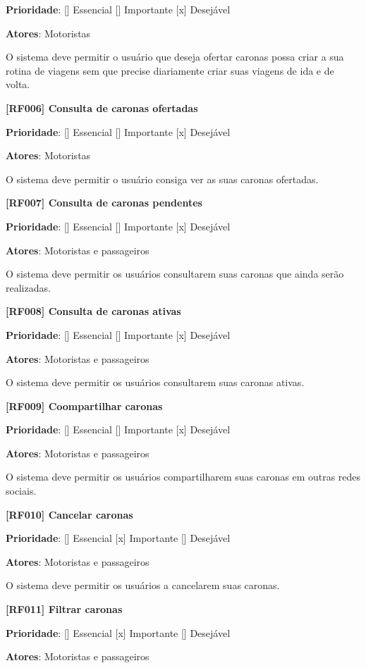 \textbf{Prioridade}:      [] Essencial        [] Importante     [x] Desejável 

\textbf{Atores}: Motoristas

O sistema deve permitir o usuário que deseja ofertar caronas possa criar a sua rotina de viagens sem que precise diariamente criar suas viagens de ida e de volta.


\textbf{[RF006] Consulta de caronas ofertadas}

\textbf{Prioridade}:      [] Essencial        [] Importante     [x] Desejável 

\textbf{Atores}: Motoristas

O sistema deve permitir o usuário consiga ver as suas caronas ofertadas.


\textbf{[RF007] Consulta de caronas pendentes}

\textbf{Prioridade}:      [] Essencial        [] Importante     [x] Desejável 

\textbf{Atores}: Motoristas e passageiros

O sistema deve permitir os usuários consultarem suas caronas que ainda serão realizadas.

\textbf{[RF008] Consulta de caronas ativas}

\textbf{Prioridade}:      [] Essencial        [] Importante     [x] Desejável 

\textbf{Atores}: Motoristas e passageiros

O sistema deve permitir os usuários consultarem suas caronas ativas.

\textbf{[RF009] Coompartilhar caronas}

\textbf{Prioridade}:      [] Essencial        [] Importante     [x] Desejável 

\textbf{Atores}: Motoristas e passageiros

O sistema deve permitir os usuários compartilharem suas caronas em outras redes sociais.

\textbf{[RF010] Cancelar caronas}

\textbf{Prioridade}:      [] Essencial        [x] Importante     [] Desejável 

\textbf{Atores}: Motoristas e passageiros

O sistema deve permitir os usuários a cancelarem suas caronas.


\textbf{[RF011] Filtrar caronas}

\textbf{Prioridade}:      [] Essencial        [x] Importante     [] Desejável 

\textbf{Atores}: Motoristas e passageiros

